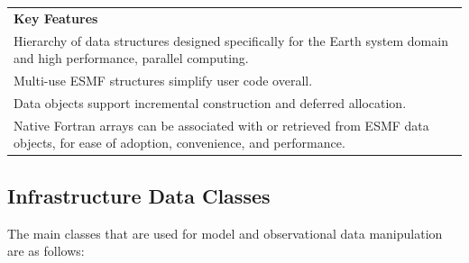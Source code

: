 \begin{center}  
\begin{tabular}{|p{6in}|}
\hline
\vspace{.01in}
{\bf Key Features} \\[.01in]
Hierarchy of data structures designed specifically for the Earth 
system domain and high performance, parallel computing. \\
Multi-use ESMF structures simplify user code overall. \\
Data objects support incremental construction and deferred allocation. \\ 
Native Fortran arrays can be associated with or retrieved from ESMF data
objects, for ease of adoption, convenience, and performance. \\[.03in] \hline
\end{tabular}
\end{center}

\subsection{Infrastructure Data Classes}

The main classes that are used for model and observational data manipulation
are as follows:


